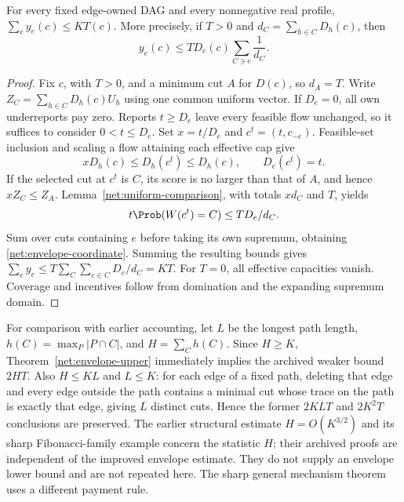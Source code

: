 \begin{theorem}\label{net:envelope-upper}
For every fixed edge-owned DAG and every nonnegative real profile,
$\sum_ey_e(c)\le KT(c)$.  More precisely, if $T>0$ and
$d_C=\sum_{h\in C}D_h(c)$, then
\begin{equation}\label{net:envelope-coordinate}
 y_e(c)\le T D_e(c)\sum_{C\ni e}\frac1{d_C}.
\end{equation}
\end{theorem}
\begin{proof}
Fix $c$, with $T>0$, and a minimum cut $A$ for $D(c)$, so $d_A=T$.
Write $Z_C=\sum_{h\in C}D_h(c)U_h$ using one common uniform vector.
If $D_e=0$, all own underreports pay zero.
Reports $t\ge D_e$ leave every feasible flow unchanged, so it suffices to
consider $0<t\le D_e$.  Set $x=t/D_e$ and $c^t=(t,c_{-e})$.
Feasible-set inclusion and scaling a flow attaining each effective cap give
\[
 xD_h(c)\le D_h(c^t)\le D_h(c),\qquad D_e(c^t)=t.
\]
If the selected cut at $c^t$ is $C$, its score is no larger than that of $A$,
and hence $xZ_C\le Z_A$.  Lemma~\ref{net:uniform-comparison}, with totals
$xd_C$ and $T$, yields
\[
 t\Prob(W(c^t)=C)\le TD_e/d_C.
\]
Sum over cuts containing $e$ before taking its own supremum, obtaining
\eqref{net:envelope-coordinate}.  Summing the resulting bounds gives
$\sum_ey_e\le T\sum_C\sum_{e\in C}D_e/d_C=KT$.
For $T=0$, all effective capacities vanish.  Coverage and incentives follow
from domination and the expanding supremum domain.
\end{proof}
For comparison with earlier accounting, let $L$ be the longest path length,
$h(C)=\max_P|P\cap C|$, and $H=\sum_Ch(C)$.
Since $H\ge K$, Theorem~\ref{net:envelope-upper} immediately implies the
archived weaker bound $2HT$.  Also $H\le KL$ and $L\le K$: for each edge
of a fixed path, deleting that edge and every edge outside the path contains
a minimal cut whose trace on the path is exactly that edge, giving $L$
distinct cuts.  Hence the former $2KLT$ and $2K^2T$ conclusions are preserved.
The earlier structural estimate $H=O(K^{3/2})$ and its sharp Fibonacci-family
example concern the statistic $H$; their archived proofs are independent
of the improved envelope estimate.  They do not supply an envelope lower
bound and are not repeated here.  The sharp general mechanism theorem uses
a different payment rule.


